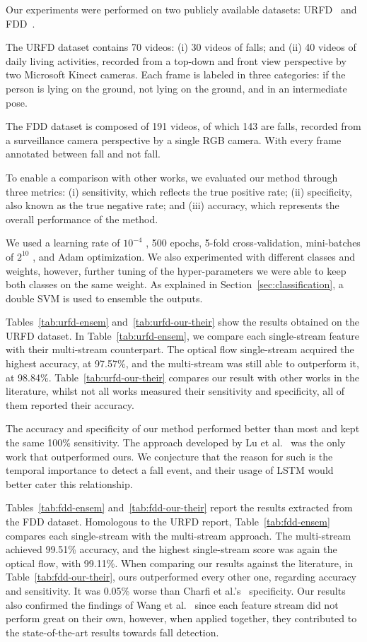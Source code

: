 \documentclass[conference]{IEEEtran}
\begin{document}
Our experiments were performed on two publicly available
datasets: URFD~\cite{kepski2014human} and FDD~\cite{charfi2013optimised}.\par
The URFD dataset contains 70 videos: (i) 30 videos of falls; and (ii) 40 videos of daily living activities, recorded from a top-down and front view perspective by two Microsoft Kinect cameras. Each frame is labeled in three categories: if the person is lying on the ground, not lying on the ground, and in an intermediate pose.\par
The FDD dataset is composed of 191 videos, of which 143 are falls, recorded from a surveillance camera perspective by a single RGB camera. With every frame annotated between fall and not fall.\par
To enable a comparison with other works, we evaluated our method through three metrics: (i) sensitivity, which reflects the true positive rate; (ii) specificity, also known as the true negative rate; and (iii) accuracy, which represents the overall performance of the method.\par
We used a learning rate of $10^{−4}$ , 500 epochs, 5-fold cross-validation, mini-batches of $2^{10}$ , and Adam optimization. We also experimented with different classes and weights, however, further tuning of the hyper-parameters we were able to keep both classes on the same weight. As explained in Section~\ref{sec:classification}, a double SVM is used to ensemble the outputs.\par
Tables~\ref{tab:urfd-ensem} and~\ref{tab:urfd-our-their} show the results obtained on the URFD dataset. In Table~\ref{tab:urfd-ensem}, we compare each single-stream feature with their multi-stream counterpart. The optical flow single-stream acquired the highest accuracy, at 97.57\%, and the multi-stream was still able to outperform it, at 98.84\%. Table~\ref{tab:urfd-our-their} compares our result with other works in the literature, whilst not all works measured their sensitivity and specificity, all of them reported their accuracy.\par
The accuracy and specificity of our method performed better than most and kept the same 100\% sensitivity. The approach developed by Lu et al.~\cite{lu2018deep} was the only work that outperformed ours. We conjecture that the reason for such is the temporal importance to detect a fall event, and their usage of LSTM would better cater this relationship.\par
Tables~\ref{tab:fdd-ensem} and~\ref{tab:fdd-our-their} report the results extracted from the FDD dataset. Homologous to the URFD report, Table~\ref{tab:fdd-ensem} compares each single-stream with the multi-stream approach. The multi-stream achieved 99.51\% accuracy, and the highest single-stream score was again the optical flow, with 99.11\%. When comparing our results against the literature, in Table~\ref{tab:fdd-our-their}, ours outperformed every other one, regarding accuracy and sensitivity. It was 0.05\% worse than Charfi et al.'s~\cite{charfi2013optimised} specificity. Our results also confirmed the findings of Wang et al.~\cite{wang2015towards} since each feature stream did not perform great on their own, however, when applied together, they contributed to the state-of-the-art results towards fall detection.
\end{document}
